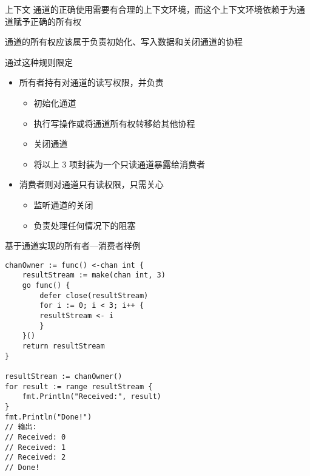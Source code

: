 \begin{frame}{上下文}
    通道的正确使用需要有合理的上下文环境，而这个上下文环境依赖于为通道赋予正确的所有权

    \bigskip
    \alert{通道的所有权应该属于负责初始化、写入数据和关闭通道的协程}
    
    通过这种规则限定
    \begin{itemize}
        \item\pause \alert{所有者}持有对通道的\alert{读写权限}，并负责
            \begin{itemize}
                \item 初始化通道
                \item 执行写操作或将通道所有权转移给其他协程
                \item \alert{关闭通道}
                \item 将以上 3 项封装为一个只读通道暴露给消费者
            \end{itemize}
        \item\pause \alert{消费者}则对通道只有\alert{读权限}，只需关心
            \begin{itemize}
                \item 监听通道的关闭
                \item 负责处理任何情况下的阻塞
            \end{itemize}
    \end{itemize} 
\end{frame}

\begin{frame}[fragile]{基于通道实现的所有者---消费者样例}
\begin{lstlisting}[xleftmargin=8pt]
chanOwner := func() <-chan int {
    resultStream := make(chan int, 3)
    go func() {
        defer close(resultStream)
        for i := 0; i < 3; i++ {
        resultStream <- i
        }
    }()
    return resultStream
}
    
resultStream := chanOwner()
for result := range resultStream {
    fmt.Println("Received:", result)
}
fmt.Println("Done!")
// 输出:
// Received: 0
// Received: 1
// Received: 2
// Done!    
\end{lstlisting}
\end{frame}
